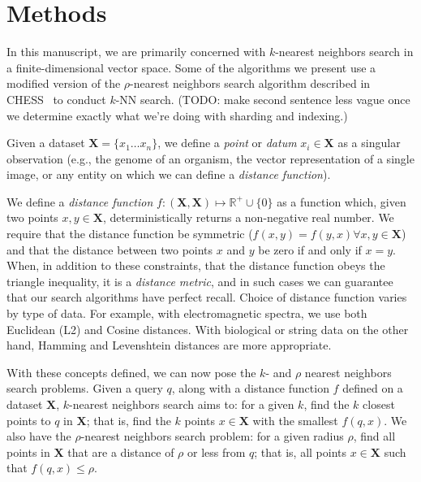 \section{Methods}
\label{sec:methods}

In this manuscript, we are primarily concerned with $k$-nearest neighbors search in a finite-dimensional 
vector space. Some of the algorithms we present use a modified version of the $\rho$-nearest neighbors search 
algorithm described in CHESS~\cite{ishaq2019clustered} to conduct $k$-NN search. (TODO: make second sentence less 
vague once we determine exactly what we're doing with sharding and indexing.)

Given a dataset $\textbf{X} = \{x_1 \dots x_n\}$, we define a \emph{point} or \emph{datum} $x_i \in \textbf{X}$ as a singular observation (e.g., the genome of 
an organism, the vector representation of a single image, or any entity on which we can define a \emph{distance function}).

We define a \emph{distance function} $f : (\textbf{X}, \textbf{X}) \mapsto \mathbb{R}^+ \cup \{0\}$ as a function which, 
given two points $x, y \in \textbf{X}$, deterministically returns a non-negative real number. We require that the distance function 
be symmetric ($f(x, y) = f(y, x) \forall x, y \in \textbf{X}$) and that the distance between two points $x$ and $y$ be zero if and only if $x = y$. 
When, in addition to these constraints, that the distance function obeys
the triangle inequality, it is a \emph{distance metric}, and in such cases we can guarantee that our search algorithms have perfect recall. 
Choice of distance function varies by type of data. For example, with electromagnetic spectra, we use both 
Euclidean (L2) and Cosine distances. With biological or string data on the other hand, Hamming and Levenshtein distances are more appropriate.

With these concepts defined, we can now pose the $k$- and $\rho$ nearest neighbors search problems.
Given a query $q$, along with a distance function $f$ defined on a dataset $ \textbf{X}$, $k$-nearest neighbors search aims to: 
for a given $k$, find the $k$ closest points to $q$ in $ \textbf{X}$; that is, find the $k$ points $x \in \textbf{X}$ with the smallest $f(q, x)$.
We also have the $\rho$-nearest neighbors search problem: for a given radius $\rho$, find all points in $\textbf{X}$ that are a distance of $\rho$ 
or less from $q$; that is, all points $x \in \textbf{X}$ such that $f(q, x) \leq \rho$.

